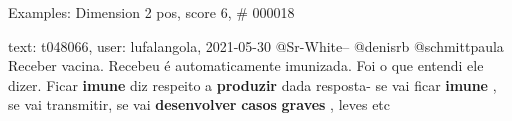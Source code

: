 \begin{frame}{Examples: Dimension 2 pos, score 6, \# 000018}
\footnotesize
\begin{exampleblock}{text: t048066, user: lufalangola, 2021-05-30}
@Sr-White-- @denisrb @schmittpaula Receber vacina. Recebeu é automaticamente 
imunizada. Foi o que entendi ele dizer. Ficar \textbf{imune} diz respeito a 
\textbf{produzir} dada resposta- se vai ficar \textbf{imune} , se vai 
transmitir, se vai \textbf{desenvolver} \textbf{casos} \textbf{graves} , leves 
etc 
\end{exampleblock}
\end{frame}
